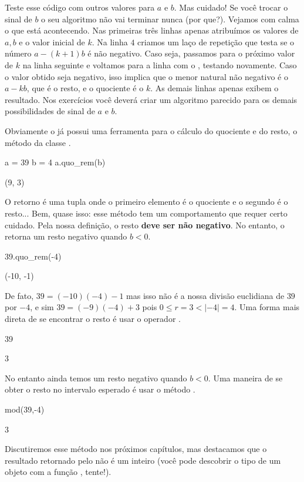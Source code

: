 Teste esse código com outros valores para $a$ e $b$. Mas
cuidado! Se você trocar o sinal de $b$ o seu algoritmo não
vai terminar nunca (por que?). Vejamos com calma o que está
acontecendo. Nas primeiras três linhas apenas atribuímos
os valores de $a, b$ e o valor inicial de $k$. Na linha
$4$ criamos um laço de repetição que testa se o número 
$a-(k+1)b$ é não negativo. Caso seja, passamos para o
próximo valor de $k$ na linha seguinte
e voltamos para a linha com o , testando novamente. Caso o valor
obtido seja negativo, isso implica que o menor natural
não negativo é o $a-kb$, que é o resto, e o quociente
é o $k$. As demais linhas apenas exibem o resultado.
Nos exercícios você deverá criar um algoritmo
parecido para os demais possibilidades de sinal de $a$ e $b$.

Obviamente o \Sage já possui uma ferramenta para 
o cálculo do quociente e do resto, o método
 da classe .
\begin{sageinput}
a = 39
b = 4
a.quo_rem(b)
\end{sageinput}
\begin{sageoutput}
(9, 3)
\end{sageoutput}

O retorno é uma tupla onde o primeiro elemento
é o quociente e o segundo é o resto... Bem, quase
isso: esse método tem um comportamento que 
requer certo cuidado. Pela nossa definição, o resto
\textbf{deve ser não negativo}. No entanto, o 
 retorna um resto negativo
quando $b<0$. 
\begin{sageinput}
39.quo_rem(-4)                                                                                     
\end{sageinput}
\begin{sageoutput}
(-10, -1)
\end{sageoutput}

De fato, $39 = (-10)(-4)-1$ mas isso não é 
a nossa divisão euclidiana de $39$ por $-4$, e
sim $39 = (-9)(-4)+3$ pois $0\leq r = 3 < |-4| = 4$.
Uma forma mais direta de se encontrar
o resto é usar o operador \ils{\%}.

\begin{sageinput}
39 %
\end{sageinput}
\begin{sageoutput}
3
\end{sageoutput}
No entanto ainda temos um resto negativo quando $b<0$. 
Uma maneira de se obter o resto no intervalo esperado
é usar o método . 
\begin{sageinput}
mod(39,-4)
\end{sageinput}
\begin{sageoutput}
3
\end{sageoutput}
Discutiremos esse método nos próximos capítulos, mas 
destacamos que o resultado retornado pelo 
não é um inteiro (você pode descobrir o tipo 
de um objeto com a função , tente!).

